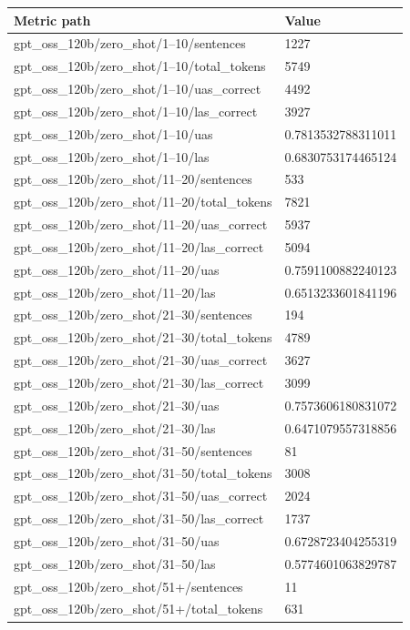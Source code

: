 \begin{tabular}{ll}
\hline
Metric path & Value \\
\hline
gpt\_oss\_120b/zero\_shot/1–10/sentences & 1227 \\
gpt\_oss\_120b/zero\_shot/1–10/total\_tokens & 5749 \\
gpt\_oss\_120b/zero\_shot/1–10/uas\_correct & 4492 \\
gpt\_oss\_120b/zero\_shot/1–10/las\_correct & 3927 \\
gpt\_oss\_120b/zero\_shot/1–10/uas & 0.7813532788311011 \\
gpt\_oss\_120b/zero\_shot/1–10/las & 0.6830753174465124 \\
gpt\_oss\_120b/zero\_shot/11–20/sentences & 533 \\
gpt\_oss\_120b/zero\_shot/11–20/total\_tokens & 7821 \\
gpt\_oss\_120b/zero\_shot/11–20/uas\_correct & 5937 \\
gpt\_oss\_120b/zero\_shot/11–20/las\_correct & 5094 \\
gpt\_oss\_120b/zero\_shot/11–20/uas & 0.7591100882240123 \\
gpt\_oss\_120b/zero\_shot/11–20/las & 0.6513233601841196 \\
gpt\_oss\_120b/zero\_shot/21–30/sentences & 194 \\
gpt\_oss\_120b/zero\_shot/21–30/total\_tokens & 4789 \\
gpt\_oss\_120b/zero\_shot/21–30/uas\_correct & 3627 \\
gpt\_oss\_120b/zero\_shot/21–30/las\_correct & 3099 \\
gpt\_oss\_120b/zero\_shot/21–30/uas & 0.7573606180831072 \\
gpt\_oss\_120b/zero\_shot/21–30/las & 0.6471079557318856 \\
gpt\_oss\_120b/zero\_shot/31–50/sentences & 81 \\
gpt\_oss\_120b/zero\_shot/31–50/total\_tokens & 3008 \\
gpt\_oss\_120b/zero\_shot/31–50/uas\_correct & 2024 \\
gpt\_oss\_120b/zero\_shot/31–50/las\_correct & 1737 \\
gpt\_oss\_120b/zero\_shot/31–50/uas & 0.6728723404255319 \\
gpt\_oss\_120b/zero\_shot/31–50/las & 0.5774601063829787 \\
gpt\_oss\_120b/zero\_shot/51+/sentences & 11 \\
gpt\_oss\_120b/zero\_shot/51+/total\_tokens & 631 \\

\end{tabular}
